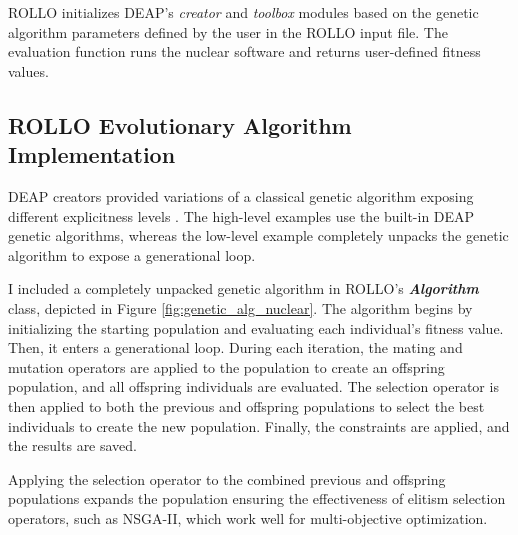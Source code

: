 \gls{ROLLO} initializes \gls{DEAP}'s \textit{creator} and \textit{toolbox} modules 
based on the genetic algorithm parameters defined by the user in the \gls{ROLLO} 
input file. 
The evaluation function runs the nuclear software and returns user-defined 
fitness values. 

\subsection{ROLLO Evolutionary Algorithm Implementation}
\gls{DEAP} creators provided variations of a classical genetic algorithm 
exposing different explicitness levels \cite{fortin_deap_2012}. 
The high-level examples use the built-in \gls{DEAP} genetic algorithms, 
whereas the low-level example completely unpacks the genetic algorithm to expose 
a generational loop. 

I included a completely unpacked genetic algorithm in ROLLO's 
\textbf{\textit{Algorithm}} class, depicted in Figure \ref{fig:genetic_alg_nuclear}. 
The algorithm begins by initializing the starting population and evaluating 
each individual's fitness value. 
Then, it enters a generational loop. 
During each iteration, the mating and mutation operators are applied to the population
to create an offspring population, and all offspring individuals are evaluated. 
The selection operator is then applied to both the previous and offspring populations 
to select the best individuals to create the new population. 
Finally, the constraints are applied, and the results are saved.

Applying the selection operator to the combined previous and offspring 
populations expands the population ensuring the effectiveness of 
elitism selection operators, such as NSGA-II, which work well 
for multi-objective optimization. 

